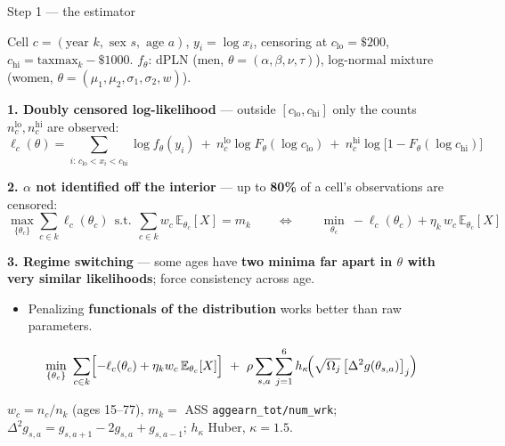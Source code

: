 \documentclass[10pt,aspectratio=169]{beamer}
\newcommand{\LOWC}{c_{\text{lo}}}
\newcommand{\HIGHC}{c_{\text{hi}}}
\begin{document}
\begin{frame}{Step 1 --- the estimator}
  \small
  {\footnotesize Cell $c=(\text{year }k,\text{ sex }s,\text{ age }a)$, $y_i=\log x_i$, censoring
  at $\LOWC=\$200$, $\HIGHC=\text{taxmax}_k-\$1000$. $f_\theta$: dPLN (men,
  $\theta=(\alpha,\beta,\nu,\tau)$), log-normal mixture (women,
  $\theta=(\mu_1,\mu_2,\sigma_1,\sigma_2,w)$).\par}

  \smallskip
  \textbf{1. Doubly censored log-likelihood} --- outside $[\LOWC,\HIGHC]$ only the counts
  $n^{\text{lo}}_c,n^{\text{hi}}_c$ are observed:
  \vspace{-5pt}
  \[
    \ell_c(\theta)=\!\!\sum_{i:\,\LOWC<x_i<\HIGHC}\!\!\log f_\theta(y_i)
      \ +\ n^{\text{lo}}_c\log F_\theta(\log\LOWC)
      \ +\ n^{\text{hi}}_c\log\bigl[1-F_\theta(\log\HIGHC)\bigr]
  \]
  \vspace{-13pt}

  \textbf{2. $\alpha$ not identified off the interior} --- up to \textbf{80\%} of a cell's
  observations are censored:
  \vspace{-5pt}
  \[
    \max_{\{\theta_c\}}\sum_{c\in k}\ell_c(\theta_c)
    \ \ \text{s.t.}\ \ \sum_{c\in k}w_c\,\mathbb{E}_{\theta_c}[X]=m_k
    \qquad\Longleftrightarrow\qquad
    \min_{\theta_c}\ -\ell_c(\theta_c)+\eta_k\,w_c\,\mathbb{E}_{\theta_c}[X]
  \]
  \vspace{-13pt}

  \textbf{3. Regime switching} --- some ages have \textbf{two minima far apart in $\theta$ with
  very similar likelihoods}; force consistency across age.
  \begin{itemize}\itemsep0pt
    \item Penalizing \textbf{functionals of the distribution} works better than raw parameters.
  \end{itemize}
  \vspace{-4pt}
  \[
    \min_{\{\theta_c\}}\ \sum_{c\in k}\Bigl[-\ell_c(\theta_c)+\eta_k w_c\,\mathbb{E}_{\theta_c}[X]\Bigr]
      \ +\ \rho\sum_{s,a}\sum_{j=1}^{6} h_\kappa\!\Bigl(\sqrt{\Omega_j}\,
        \bigl[\Delta^2 g(\theta_{s,a})\bigr]_j\Bigr)
  \]
  \vspace{-11pt}

  {\footnotesize $w_c=n_c/n_k$ (ages 15--77), $m_k=$ ASS \texttt{aggearn\_tot/num\_wrk};
  $\Delta^2 g_{s,a}=g_{s,a+1}-2g_{s,a}+g_{s,a-1}$; $h_\kappa$ Huber, $\kappa=1.5$.\par}
\end{frame}
\end{document}
